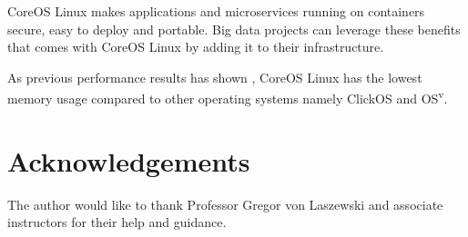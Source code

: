 \documentclass[9pt,twocolumn,twoside]{styles/osajnl}
\begin{document}
CoreOS Linux makes applications and microservices running on
containers secure, easy to deploy and portable. Big data projects can
leverage these benefits that comes with CoreOS Linux by adding it to
their infrastructure.

As previous performance results has shown \cite{2016NFVSolutions},
CoreOS Linux has the lowest memory usage compared to other
operating systems namely ClickOS and OS\textsuperscript{v}.


\section*{Acknowledgements}
The author would like to thank Professor Gregor von Laszewski and
associate instructors for their help and guidance.





 

\newpage

\appendix
\end{document}
